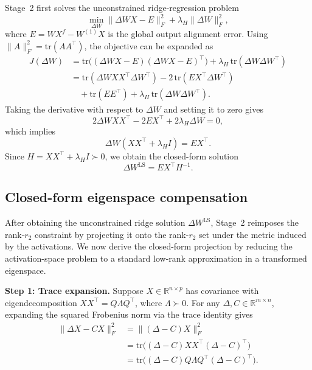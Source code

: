\documentclass[a4paper,fleqn]{cas-dc}
\begin{document}
Stage~2 first solves the unconstrained ridge-regression problem
\begin{equation}
\min_{\Delta W} \|\Delta W X - E\|_F^2 + \lambda_H \|\Delta W\|_F^2,
\end{equation}
where $E = WX^f - W^{(1)}X$ is the global output alignment error.
Using $\|A\|_F^2 = \mathrm{tr}(AA^{\top})$, the objective can be expanded as
\begin{equation}
\begin{aligned}
J(\Delta W)
&= \mathrm{tr}\big((\Delta W X-E)(\Delta W X-E)^{\top}\big) + \lambda_H\,\mathrm{tr}(\Delta W\Delta W^{\top}) \\
&= \mathrm{tr}(\Delta W X X^{\top} \Delta W^{\top}) - 2\,\mathrm{tr}(E X^{\top}\Delta W^{\top}) \\
&\quad + \mathrm{tr}(EE^{\top}) + \lambda_H\,\mathrm{tr}(\Delta W\Delta W^{\top}).
\end{aligned}
\end{equation}
Taking the derivative with respect to $\Delta W$ and setting it to zero gives
\begin{equation}
2\Delta W X X^{\top} - 2EX^{\top} + 2\lambda_H \Delta W = 0,
\end{equation}
which implies
\begin{equation}
\Delta W(XX^{\top} + \lambda_H I) = EX^{\top}.
\end{equation}
Since $H = XX^{\top} + \lambda_H I \succ 0$, we obtain the closed-form solution
\begin{equation}
\Delta W^{\mathrm{LS}} = EX^{\top}H^{-1}.
\end{equation}

\subsection{Closed-form eigenspace compensation}\label{app:eigenspace-projection}

After obtaining the unconstrained ridge solution $\Delta W^{\mathrm{LS}}$, Stage~2 reimposes the rank-$r_2$ constraint by projecting it onto the rank-$r_2$ set under the metric induced by the activations. We now derive the closed-form projection by reducing the activation-space problem to a standard low-rank approximation in a transformed eigenspace.

\medskip
\noindent\textbf{Step 1: Trace expansion.}
Suppose $X \in \mathbb{R}^{n\times p}$ has covariance with eigendecomposition $XX^{\top}=Q\Lambda Q^{\top}$, where $\Lambda \succ 0$. For any $\Delta, C \in \mathbb{R}^{m\times n}$, expanding the squared Frobenius norm via the trace identity gives
\begin{equation}
\begin{aligned}
\|\Delta X - CX\|_F^2
&= \|(\Delta-C)X\|_F^2 \\
&= \mathrm{tr}\big((\Delta-C)XX^{\top}(\Delta-C)^{\top}\big) \\
&= \mathrm{tr}\big((\Delta-C)Q\Lambda Q^{\top}(\Delta-C)^{\top}\big).
\end{aligned}
\end{equation}
\end{document}
